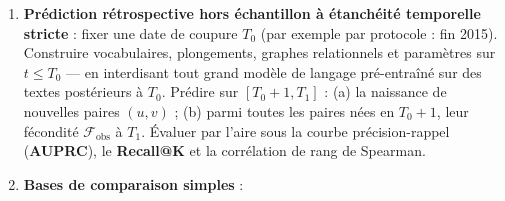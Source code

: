 \documentclass[a4paper,11pt]{article}
\providecommand{\tightlist}{\setlength{\itemsep}{0pt}\setlength{\parskip}{0pt}}
\begin{document}
\begin{enumerate}
\def\labelenumi{\arabic{enumi}.}
\tightlist
\item
  \textbf{Prédiction rétrospective hors échantillon à étanchéité
  temporelle stricte} : fixer une date de coupure \(T_0\) (par exemple
  par protocole : fin 2015). Construire vocabulaires, plongements,
  graphes relationnels et paramètres sur \(t \le T_0\) --- en
  interdisant tout grand modèle de langage pré-entraîné sur des textes
  postérieurs à \(T_0\). Prédire sur \([T_0+1, T_1]\) : (a) la naissance
  de nouvelles paires \((u,v)\) ; (b) parmi toutes les paires nées en
  \(T_0+1\), leur fécondité \(\mathcal{F}_{\text{obs}}\) à \(T_1\).
  Évaluer par l'aire sous la courbe précision-rappel (\textbf{AUPRC}),
  le \textbf{Recall@K} et la corrélation de rang de Spearman.
\item
  \textbf{Bases de comparaison simples} :


\end{enumerate}
\end{document}
